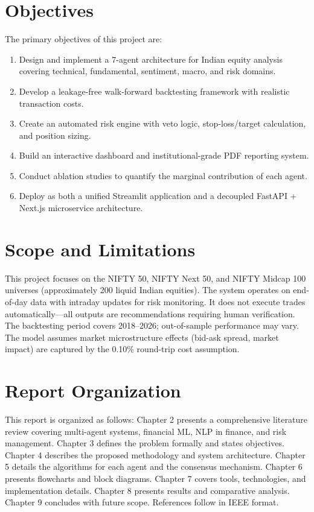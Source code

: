 \documentclass[12pt,a4paper]{report}
\begin{document}
\section{Objectives}
The primary objectives of this project are:
\begin{enumerate}
    \item Design and implement a 7-agent architecture for Indian equity analysis covering technical, fundamental, sentiment, macro, and risk domains.
    \item Develop a leakage-free walk-forward backtesting framework with realistic transaction costs.
    \item Create an automated risk engine with veto logic, stop-loss/target calculation, and position sizing.
    \item Build an interactive dashboard and institutional-grade PDF reporting system.
    \item Conduct ablation studies to quantify the marginal contribution of each agent.
    \item Deploy as both a unified Streamlit application and a decoupled FastAPI + Next.js microservice architecture.
\end{enumerate}

\section{Scope and Limitations}
This project focuses on the NIFTY 50, NIFTY Next 50, and NIFTY Midcap 100 universes (approximately 200 liquid Indian equities). The system operates on end-of-day data with intraday updates for risk monitoring. It does not execute trades automatically---all outputs are recommendations requiring human verification. The backtesting period covers 2018--2026; out-of-sample performance may vary. The model assumes market microstructure effects (bid-ask spread, market impact) are captured by the 0.10\% round-trip cost assumption.

\section{Report Organization}
This report is organized as follows: Chapter 2 presents a comprehensive literature review covering multi-agent systems, financial ML, NLP in finance, and risk management. Chapter 3 defines the problem formally and states objectives. Chapter 4 describes the proposed methodology and system architecture. Chapter 5 details the algorithms for each agent and the consensus mechanism. Chapter 6 presents flowcharts and block diagrams. Chapter 7 covers tools, technologies, and implementation details. Chapter 8 presents results and comparative analysis. Chapter 9 concludes with future scope. References follow in IEEE format.
\end{document}
